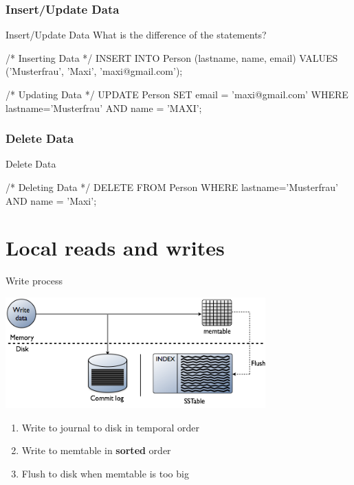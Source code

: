 \documentclass[
  10pt
]{beamer}
\begin{document}
\subsubsection{Insert/Update Data}
\begin{frame}[fragile]{Insert/Update Data \cite{cqlAlexMeng, newInCQL3}} %
  What is the difference of the statements?
  \begin{semiverbatim}
/* Inserting Data */
INSERT INTO Person (lastname, name, email)
VALUES ('Musterfrau', 'Maxi', 'maxi@gmail.com');

/* Updating Data */
UPDATE Person SET email = 'maxi@gmail.com'
WHERE lastname='Musterfrau' AND name = 'MAXI';
  \end{semiverbatim}
\end{frame}

\subsubsection{Delete Data}
\begin{frame}[fragile]{Delete Data \cite{cqlAlexMeng}}
  \begin{semiverbatim}
/* Deleting Data */
DELETE FROM Person
  WHERE lastname='Musterfrau' AND name = 'Maxi';
  \end{semiverbatim}
\end{frame}

\section{Local reads and writes}  %
\begin{frame}{Write process \cite{datastaxWriteData}}
  \begin{center}
    \includegraphics[width=0.75\textwidth]{resources/local_write.png}
    \begin{enumerate}
      \item<1-> Write to journal to disk in temporal order
      \item<2-> Write to memtable in \textbf{sorted} order
      \item<3-> Flush to disk when memtable is too big
    \end{enumerate}
  \end{center}
\end{frame}
\end{document}
